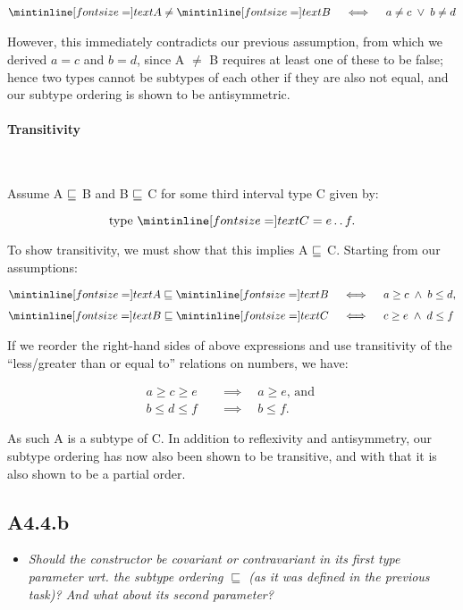 \begin{align}
  \ms A \neq \ms B \quad\iff\quad a \neq c \; \lor \; b \neq d
\end{align}

However, this immediately contradicts our previous assumption, from which we
derived $a = c$ and $b = d$, since \ms A $\neq$ \ms B requires at least one of
these to be false; hence two types cannot be subtypes of each other if they are
also not equal, and our subtype ordering is shown to be antisymmetric.

\paragraph{Transitivity}~\smallskip

Assume \ms A $\sqsubseteq$ \ms B and \ms B $\sqsubseteq$ \ms C for some third interval type
\ms C given by:

$$\text{type } \ms C = e \twodots f.$$

To show transitivity, we must show that this implies \ms A $\sqsubseteq$ \ms C.
Starting from our assumptions:

\begin{align*}
  \ms A \ltt \ms B \quad&\iff\quad a \geq c \; \land \; b \leq d,\\[4pt]
  \ms B \ltt \ms C \quad&\iff\quad c \geq e \; \land \; d \leq f
\end{align*}


If we reorder the right-hand sides of above expressions and use transitivity of
the ``less/greater than or equal to'' relations on numbers, we have:

\begin{align*}
  a \geq c \geq e \quad&\implies\quad a \geq e  \text{, and }\\[4pt]
  b \leq d \leq f \quad&\implies\quad b \leq f.
\end{align*}

As such \ms A is a subtype of \ms C. In addition to reflexivity and
antisymmetry, our subtype ordering has now also been shown to be transitive, and
with that it is also shown to be a partial order.

\sectend

\newpage
\subsection{A4.4.b}

\begin{itemize}
  \item \emph{Should the \emph{} constructor be covariant or
    contravariant in its first type parameter wrt. the subtype ordering
    $\sqsubseteq$ (as it was defined in the previous task)? And what about its
    second parameter?}
\end{itemize}

